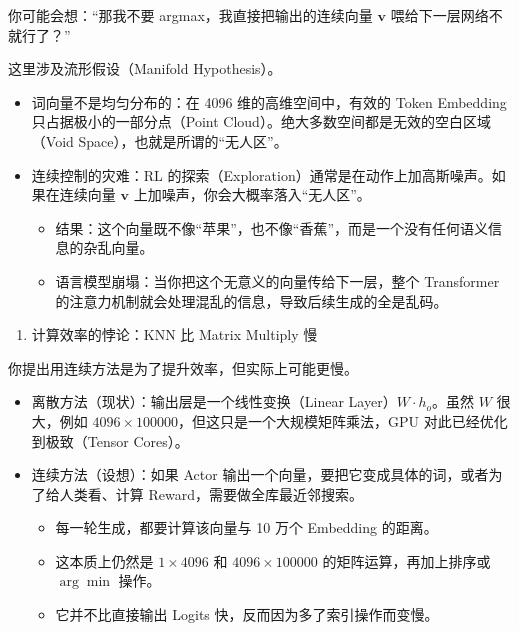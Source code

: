 你可能会想：``那我不要 argmax，我直接把输出的连续向量 \(\mathbf{v}\) 喂给下一层网络不就行了？''

这里涉及流形假设（Manifold Hypothesis）。

\begin{itemize}
\tightlist
\item
  词向量不是均匀分布的：在 4096 维的高维空间中，有效的 Token Embedding 只占据极小的一部分点（Point Cloud）。绝大多数空间都是无效的空白区域（Void Space），也就是所谓的``无人区''。
\item
  连续控制的灾难：RL 的探索（Exploration）通常是在动作上加高斯噪声。如果在连续向量 \(\mathbf{v}\) 上加噪声，你会大概率落入``无人区''。

  \begin{itemize}
  \tightlist
  \item
    结果：这个向量既不像``苹果''，也不像``香蕉''，而是一个没有任何语义信息的杂乱向量。
  \item
    语言模型崩塌：当你把这个无意义的向量传给下一层，整个 Transformer 的注意力机制就会处理混乱的信息，导致后续生成的全是乱码。
  \end{itemize}
\end{itemize}

\begin{enumerate}
\def\labelenumi{\arabic{enumi}.}
\setcounter{enumi}{2}
\tightlist
\item
  计算效率的悖论：KNN 比 Matrix Multiply 慢
\end{enumerate}

你提出用连续方法是为了提升效率，但实际上可能更慢。

\begin{itemize}
\tightlist
\item
  离散方法（现状）：输出层是一个线性变换（Linear Layer）\(W\cdot h_o\)。虽然 \(W\) 很大，例如 \(4096\times100000\)，但这只是一个大规模矩阵乘法，GPU 对此已经优化到极致（Tensor Cores）。
\item
  连续方法（设想）：如果 Actor 输出一个向量，要把它变成具体的词，或者为了给人类看、计算 Reward，需要做全库最近邻搜索。

  \begin{itemize}
  \tightlist
  \item
    每一轮生成，都要计算该向量与 10 万个 Embedding 的距离。
  \item
    这本质上仍然是 \(1\times4096\) 和 \(4096\times100000\) 的矩阵运算，再加上排序或 \(\arg\min\) 操作。
  \item
    它并不比直接输出 Logits 快，反而因为多了索引操作而变慢。
  \end{itemize}
\end{itemize}

